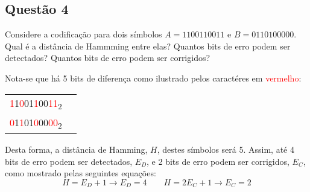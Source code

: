\documentclass{article}
\begin{document}
        \newpage\subsection{Questão 4}
            \begin{exercise}
                Considere a codificação para dois símbolos $A = 1100110011$ e $B = 0110100000$. Qual é a distância de Hammming entre elas? Quantos bits de erro podem ser detectados? Quantos bits de erro podem ser corrigidos?
            \end{exercise}
            \begin{resolution}
                Nota-se que há 5 bits de diferença como ilustrado pelos caractéres em \textcolor{red}{vermelho}:
                    \begin{table}[H]
                        \centering
                        \begin{tabular}[]{cc}\hline
                            \textcolor{red}{1}1\textcolor{red}{0}01\textcolor{red}{1}00\textcolor{red}{11}\textsubscript{2}\\
                            \textcolor{red}{0}1\textcolor{red}{1}01\textcolor{red}{0}00\textcolor{red}{00}\textsubscript{2}\\\hline
                        \end{tabular}
                    \end{table}\noindent
                Desta forma, a distância de Hamming, $H$, destes símbolos será 5. Assim, até 4 bits de erro podem ser detectados, $E_{D}$, e 2 bits de erro podem ser corrigidos, $E_{C}$, como mostrado pelas seguintes equações:
                    \begin{equation*}
                        H =  E_{D} + 1 \rightarrow \boxed{E_{D} = 4}
                        \qquad
                        H = 2E_{C} + 1 \rightarrow \boxed{E_{C} = 2}
                    \end{equation*}
            \end{resolution}
\end{document}
